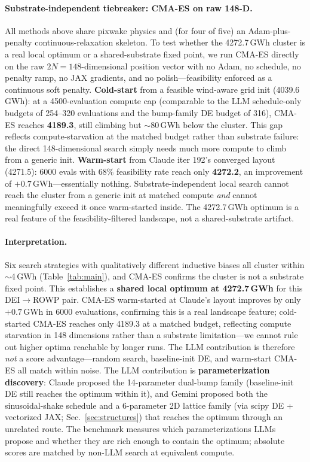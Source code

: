 \paragraph{Substrate-independent tiebreaker: CMA-ES on raw 148-D.}
All methods above share pixwake physics and (for four of five) an
Adam-plus-penalty continuous-relaxation skeleton. To test whether
the 4272.7\,GWh cluster is a real local optimum or a shared-substrate
fixed point, we run CMA-ES directly on the raw $2N=148$-dimensional
position vector with no Adam, no schedule, no penalty ramp, no JAX
gradients, and no polish---feasibility enforced as a continuous
soft penalty. \textbf{Cold-start} from a feasible wind-aware grid
init (4039.6\,GWh): at a 4500-evaluation compute cap (comparable
to the LLM schedule-only budgets of 254--320 evaluations and the
bump-family DE budget of 316), CMA-ES reaches \textbf{4189.3},
still climbing but $\sim$80\,GWh below the cluster. This gap
reflects compute-starvation at the matched budget rather than
substrate failure: the direct 148-dimensional search simply needs
much more compute to climb from a generic init.
\textbf{Warm-start} from Claude iter 192's converged layout
(4271.5): 6000 evals with 68\% feasibility rate reach only
\textbf{4272.2}, an improvement of $+0.7$\,GWh---essentially
nothing. Substrate-independent local search cannot reach the
cluster from a generic init at matched compute \emph{and} cannot
meaningfully exceed it once warm-started inside. The 4272.7\,GWh
optimum is a real feature of the feasibility-filtered
landscape, not a shared-substrate artifact.

\paragraph{Interpretation.}
Six search strategies with qualitatively different inductive
biases all cluster within $\sim$4\,GWh (Table~\ref{tab:main}), and
CMA-ES confirms the cluster is not a substrate fixed point. This
establishes a \textbf{shared local optimum at 4272.7\,GWh} for
this DEI$\to$ROWP pair. CMA-ES warm-started at Claude's layout
improves by only $+0.7$\,GWh in 6000 evaluations, confirming
this is a real landscape feature; cold-started CMA-ES reaches
only 4189.3 at a matched budget, reflecting compute starvation
in 148 dimensions rather than a substrate limitation---we cannot
rule out higher optima reachable by longer runs.
The LLM contribution is therefore
\emph{not} a score advantage---random search, baseline-init DE,
and warm-start CMA-ES all match within noise. The LLM contribution
is \textbf{parameterization discovery}: Claude proposed the
14-parameter dual-bump family (baseline-init DE still reaches
the optimum within it), and Gemini proposed both the
sinusoidal-shake schedule and a 6-parameter 2D lattice family
(via scipy DE + vectorized JAX; Sec.~\ref{sec:structures}) that
reaches the optimum through an unrelated route. The benchmark
measures which parameterizations LLMs propose and whether they
are rich enough to contain the optimum; absolute scores are
matched by non-LLM search at equivalent compute.


